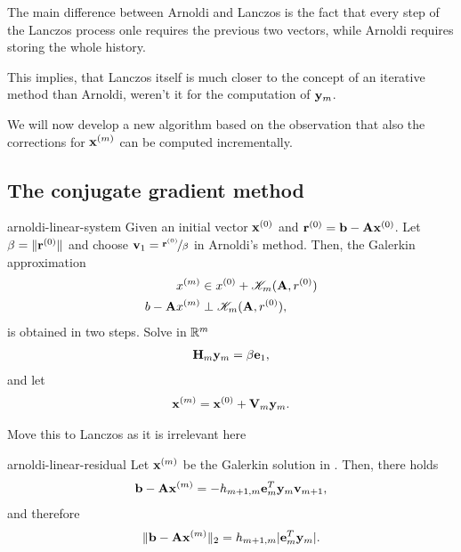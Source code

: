 \begin{remark}
  The main difference between Arnoldi and Lanczos is the fact that
  every step of the Lanczos process onle requires the previous two
  vectors, while Arnoldi requires storing the whole history.

  This implies, that Lanczos itself is much closer to the concept of
  an iterative method than Arnoldi, weren't it for the computation of
  $\mathbf y_m$.

  We will now develop a new algorithm based on the observation that
  also the corrections for $\mathbf x^{(m)}$ can be computed incrementally.
\end{remark}



\subsection{The conjugate gradient method}

\begin{Theorem}{arnoldi-linear-system}
  Given an initial vector $\mathbf x^{(0)}$ and
  $\mathbf r^{(0)} = \mathbf b - \mathbf A \mathbf x^{(0)}$. Let $\beta=\lVert\mathbf r^{(0)}\rVert$
  and choose $\mathbf v_1 =\nicefrac{\mathbf r^{(0)}}{\beta}$ in Arnoldi's
  method. Then, the Galerkin approximation
  \begin{align}
    x^{(m)} &\in x^{(0)} + \mathscr K_m(\mathbf A,r^{(0)})\\
    b-\mathbf A x^{(m)} &\perp \mathscr K_m(\mathbf A,r^{(0)}),
  \end{align}
  is obtained in two steps. Solve in $\mathbb R^m$
  \begin{gather}
    \mathbf H_m\mathbf y_m = \beta\mathbf e_1,
  \end{gather}
  and let
  \begin{gather}
    \mathbf x^{(m)} = \mathbf x^{(0)} + \mathbf V_m \mathbf y_m.
  \end{gather}
\end{Theorem}

\begin{todo}
  Move this to Lanczos as it is irrelevant here
\end{todo}

\begin{Theorem}{arnoldi-linear-residual}
  Let $\mathbf x^{(m)}$ be the Galerkin solution in
  . Then, there holds
  \begin{gather}
    \mathbf b-\mathbf A\mathbf x^{(m)} = -h_{m+1,m} \mathbf e_m^T \mathbf y_m \mathbf v_{m+1},
  \end{gather}
  and therefore
  \begin{gather}
    \lVert\mathbf b-\mathbf A\mathbf x^{(m)}\rVert_2 = h_{m+1,m} \lvert\mathbf e_m^T \mathbf y_m\rvert.
  \end{gather}  
\end{Theorem}

